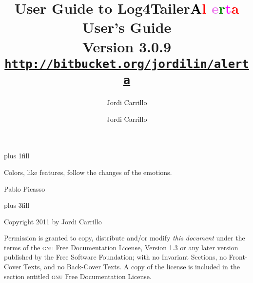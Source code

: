 \documentclass[a4paper, twoside]{article}
\author{Jordi Carrillo}
\title{User Guide to Log4Tailer}
\newcommand{\logftailer}{\textbf{\textcolor{black}{A}\textcolor{red}{l}%
\textcolor{Violet}{e}\textcolor{green}{r}\textcolor{magenta}{t}\textcolor{red}{a}}}
\newcommand{\contentsrule}[1]{{\color{blue}\sectionrule{3ex}{3pt}{-2ex}{1pt}{#1}}}
\begin{document}


\newpage
\pagecolor{white}

\vbox{}
\vskip0pt plus 1fill
\epigraph{Colors, like features, follow the changes of the emotions.}{Pablo Picasso}
 \vskip0pt plus 3fill

\noindent
Copyright 2011 by Jordi Carrillo

\medskip
\noindent 
Permission is granted to copy, distribute and/or modify \emph{this document}
under the terms of the \textsc{gnu} Free Documentation License, Version 1.3
or any later version published by the Free Software Foundation;
with no Invariant Sections, no Front-Cover Texts, and no Back-Cover Texts.
A copy of the license is included in the section entitled \textsc{gnu}
Free Documentation License.


\vbox{}
\newpage


\title{{\bfseries \logftailer{} User's Guide}\\[1mm]
  \large Version 3.0.9\\[1mm]
\large\href{http://bitbucket.org/jordilin/alerta}{\texttt{http://bitbucket.org/jordilin/alerta}}}
\author{Jordi Carrillo}

\maketitle

\tableofcontents

\newpage




%

\end{document}
